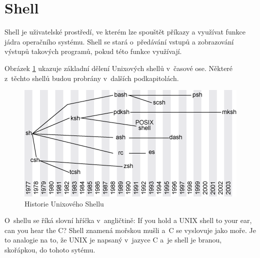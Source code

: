 \documentclass[thesis=M,czech]{FITthesis}[2012/06/26]
\begin{document}




\section{Shell}

Shell je uživatelské prostředí, ve kterém lze spouštět příkazy a využívat funkce jádra operačního systému. Shell se stará o~předávání vstupů a zobrazování výstupů takových programů, pokud této funkce využívají.

Obrázek \ref{fig:shell_history} ukazuje základní dělení Unixových shellů v~časové ose. Některé z~těchto shellů budou probrány v~dalších podkapitolách.

\begin{figure}[htb]\centering
	\includegraphics[width=\textwidth]{./images/tmp_shell_history}
	\caption{Historie Unixového Shellu \cite{historyofshells}}
	\label{fig:shell_history}
\end{figure}

O~shellu se říká slovní hříčka v~angličtině: If you hold a UNIX shell to your ear, can you hear the C? Shell znamená mořskou mušli a~C se vyslovuje jako moře. Je to analogie na to, že UNIX je napsaný v~jazyce C a~je shell je branou, skořápkou, do tohoto sytému.


\end{document}
